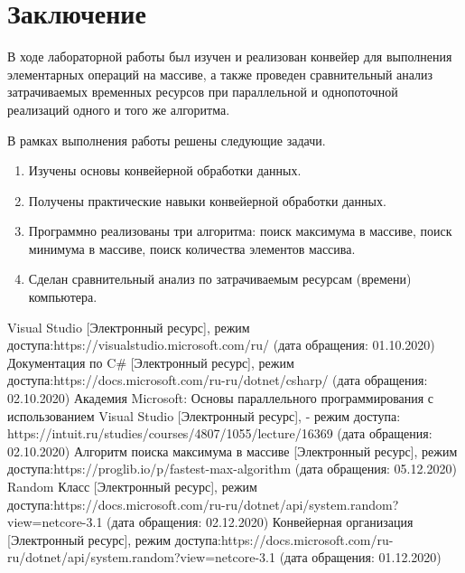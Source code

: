 \documentclass[12pt]{report}
\begin{document}
\chapter*{Заключение}
В ходе лабораторной работы был изучен и реализован конвейер для выполнения элементарных операций на массиве, а также проведен сравнительный анализ затрачиваемых временных ресурсов при параллельной и однопоточной реализаций одного и того же алгоритма. 

В рамках выполнения работы решены следующие задачи.

\begin{enumerate}
\item Изучены основы конвейерной обработки данных.
\item  Получены практические навыки конвейерной обработки данных.
\item Программно реализованы три алгоритма: поиск максимума в массиве, поиск минимума в массиве, поиск количества элементов массива.
\item Сделан сравнительный анализ по затрачиваемым ресурсам (времени) компьютера.
\end{enumerate}

%
%

\begin{thebibliography}{3}
	Visual Studio [Электронный ресурс], режим доступа:https://visualstudio.microsoft.com/ru/ (дата обращения: 01.10.2020)
	Документация по C\# [Электронный ресурс], режим доступа:https://docs.microsoft.com/ru-ru/dotnet/csharp/ (дата обращения: 02.10.2020)
	Академия Microsoft: Основы параллельного программирования с использованием Visual Studio [Электронный ресурс], - режим доступа: https://intuit.ru/studies/courses/4807/1055/lecture/16369 (дата обращения: 02.10.2020)
	 Алгоритм поиска максимума в массиве [Электронный ресурс], режим доступа:https://proglib.io/p/fastest-max-algorithm (дата обращения: 05.12.2020)
	Random Класс [Электронный ресурс], режим доступа:https://docs.microsoft.com/ru-ru/dotnet/api/system.random?view=netcore-3.1 (дата обращения: 02.12.2020)
	Конвейерная организация [Электронный ресурс], режим доступа:https://docs.microsoft.com/ru-ru/dotnet/api/system.random?view=netcore-3.1 (дата обращения: 01.12.2020)
\end{thebibliography}
\end{document}
